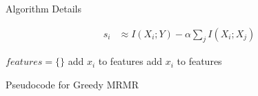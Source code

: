 \documentclass{beamer}					%
\begin{document}
\begin{frame}{Algorithm Details}

\begin{align*}
s_{i} &\approx I(X_{i};Y)- \alpha\sum_{j}I(X_{i};X_{j}) 
\end{align*}

\begin{algorithm}[H]
\begin{algorithmic}[1]
\STATE $features = \{\}$
    \STATE add $x_{i}$ to features
  \ELSE
    \STATE add $x_{i}$ to features
  \ENDIF
  \ENDIF
\ENDFOR
\end{algorithmic}
\caption{Pseudocode for Greedy MRMR}
\label{alg:seq}
\end{algorithm}

\end{frame}
\end{document}
